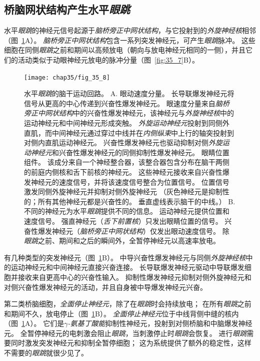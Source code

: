 \subsection{桥脑网状结构产生水平\textit{眼跳}}

水平\textit{眼跳}的神经元信号起源于\textit{脑桥旁正中网状结构}，与它投射到的\textit{外旋神经核}相邻（图~\ref{fig:35_8}A）。
\textit{脑桥旁正中网状结构}包含一系列突发神经元，可产生\textit{眼跳}脉冲。
这些细胞在同侧\textit{眼跳}之前和期间以高频放电（朝向与放电神经元相同的一侧），并且它们的活动类似于动眼神经元放电的脉冲分量（图~\ref{fig:35_7}B）。


\begin{figure}[htbp]
	\centering
	\texttt{[image: chap35/fig\_35\_8]}
	\caption{水平\textit{眼跳}的脑干运动回路。 
		A. 眼动速度分量。
		长导联爆发神经元将信号从更高的中心传递到兴奋性爆发神经元。
		眼速度分量来自\textit{脑桥旁正中网状结构}中的兴奋性爆发神经元，该神经元与\textit{外旋神经核}中的运动神经元和中间神经元形成突触。
		\textit{外旋运动神经元}投射到同侧外直肌，而中间神经元通过穿过中线并在\textit{内侧纵束}中上行的轴突投射到对侧内直肌运动神经元。
		兴奋性爆发神经元也驱动抑制对侧\textit{外旋运动神经元}和兴奋性爆发神经元的同侧抑制性爆发神经元。
		眼睛位置组件。
		该成分来自一个神经整合器，该整合器包含分布在脑干两侧的前庭内侧核和舌下前核的神经元。
		这些神经元接收来自兴奋性爆发神经元的速度信号，并将该速度信号整合为位置信号。
		位置信号激发同侧外旋神经元并抑制对侧外旋神经元
        （灰色神经元是抑制性的；所有其他神经元都是兴奋性的。
        垂直虚线表示脑干的中线。）
		B. 不同的神经元为水平\textit{眼跳}提供不同的信息。
		运动神经元提供位置和速度信号。
		强直神经元（\textit{舌下前置核}）只发出眼睛位置的信号。
		兴奋性爆发神经元（\textit{脑桥旁正中网状结构}）仅发出眼动速度信号。
		除\textit{眼跳}之前、期间和之后的瞬间外，全暂停神经元以高速率放电。}
	\label{fig:35_8}
\end{figure}


有几种类型的突发神经元（图~\ref{fig:35_8}B）。
中导兴奋性爆发神经元与同侧\textit{外旋神经核}中的运动神经元和中间神经元直接兴奋连接。
长导联爆发神经元驱动中导联爆发细胞并接收来自更高中心的兴奋性输入。
抑制性爆发神经元抑制对侧外旋神经元和对侧兴奋性爆发神经元的活动，并且自身被中导爆发神经元兴奋。


第二类桥脑细胞，\textit{全面停止神经元}，除了在\textit{眼跳}时会持续放电；
在所有\textit{眼跳}之前和期间不久，放电停止（图~\ref{fig:35_8}B）。
\textit{全面停止神经元}位于中线背侧中缝的核内（图~\ref{fig:35_8}A）。
它们是\textit{$ \gamma $-氨基丁酸能}抑制性神经元，投射到对侧桥脑和中脑爆发神经元。
全暂停神经元的电刺激会阻止\textit{眼跳}，当刺激停止时\textit{眼跳}会恢复。
进行\textit{眼跳}需要同时激发突发神经元和抑制全暂停细胞；
这为系统提供了额外的稳定性，这样不需要的\textit{眼跳}就很少见了。



